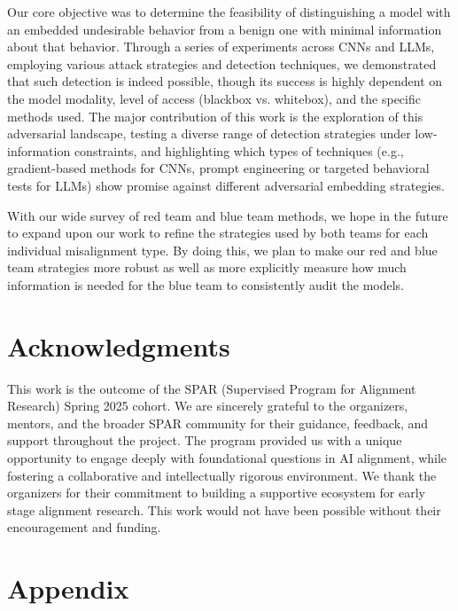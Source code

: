 \documentclass[letterpaper]{article} %
\begin{document}
Our core objective was to determine the feasibility of distinguishing a model with an embedded undesirable behavior from a benign one with minimal information about that behavior. Through a series of experiments across CNNs and LLMs, employing various attack strategies and detection techniques, we demonstrated that such detection is indeed possible, though its success is highly dependent on the model modality, level of access (blackbox vs. whitebox), and the specific methods used. The major contribution of this work is the exploration of this adversarial landscape, testing a diverse range of detection strategies under low-information constraints, and highlighting which types of techniques (e.g., gradient-based methods for CNNs, prompt engineering or targeted behavioral tests for LLMs) show promise against different adversarial embedding strategies.

With our wide survey of red team and blue team methods, we hope in the future to expand upon our work to refine the strategies used by both teams for each individual misalignment type. By doing this, we plan to make our red and blue team strategies more robust as well as more explicitly measure how much information is needed for the blue team to consistently audit the models.

\section{Acknowledgments}
This work is the outcome of the SPAR (Supervised Program for Alignment Research) Spring 2025 cohort. We are sincerely grateful to the organizers, mentors, and the broader SPAR community for their guidance, feedback, and support throughout the project. The program provided us with a unique opportunity to engage deeply with foundational questions in AI alignment, while fostering a collaborative and intellectually rigorous environment. We thank the organizers for their commitment to building a supportive ecosystem for early stage alignment research. This work would not have been possible without their encouragement and funding.

\section{Appendix}


\end{document}

